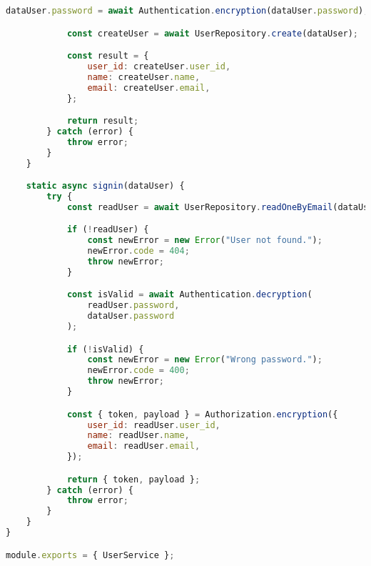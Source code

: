 \begin{lstlisting}[language=Javascript,caption={User Service}]
			dataUser.password = await Authentication.encryption(dataUser.password);

			const createUser = await UserRepository.create(dataUser);

			const result = {
				user_id: createUser.user_id,
				name: createUser.name,
				email: createUser.email,
			};

			return result;
		} catch (error) {
			throw error;
		}
	}

	static async signin(dataUser) {
		try {
			const readUser = await UserRepository.readOneByEmail(dataUser.email);

			if (!readUser) {
				const newError = new Error("User not found.");
				newError.code = 404;
				throw newError;
			}

			const isValid = await Authentication.decryption(
				readUser.password,
				dataUser.password
			);

			if (!isValid) {
				const newError = new Error("Wrong password.");
				newError.code = 400;
				throw newError;
			}

			const { token, payload } = Authorization.encryption({
				user_id: readUser.user_id,
				name: readUser.name,
				email: readUser.email,
			});

			return { token, payload };
		} catch (error) {
			throw error;
		}
	}
}

module.exports = { UserService };
\end{lstlisting}